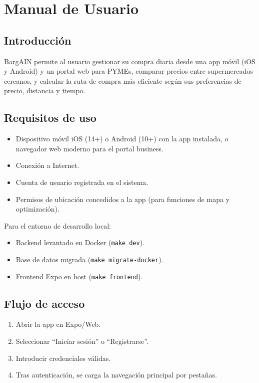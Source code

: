 
\chapter{Manual de Usuario}\label{cap09}

\section{Introducci\'on}\label{sec:manual-intro}

BargAIN permite al usuario gestionar su compra diaria desde una app m\'ovil (iOS y Android) y un
portal web para PYMEs, comparar precios entre supermercados cercanos, y calcular la ruta de compra
m\'as eficiente seg\'un sus preferencias de precio, distancia y tiempo.

\section{Requisitos de uso}\label{sec:manual-requisitos}

\begin{itemize}
  \item Dispositivo m\'ovil iOS (14+) o Android (10+) con la app instalada, o navegador web
    moderno para el portal business.
  \item Conexi\'on a Internet.
  \item Cuenta de usuario registrada en el sistema.
  \item Permisos de ubicaci\'on concedidos a la app (para funciones de mapa y optimizaci\'on).
\end{itemize}

Para el entorno de desarrollo local:
\begin{itemize}
  \item Backend levantado en Docker (\texttt{make dev}).
  \item Base de datos migrada (\texttt{make migrate-docker}).
  \item Frontend Expo en host (\texttt{make frontend}).
\end{itemize}

\section{Flujo de acceso}\label{sec:manual-acceso}

\begin{enumerate}
  \item Abrir la app en Expo/Web.
  \item Seleccionar ``Iniciar sesi\'on'' o ``Registrarse''.
  \item Introducir credenciales v\'alidas.
  \item Tras autenticaci\'on, se carga la navegaci\'on principal por pesta\~nas.
\end{enumerate}

